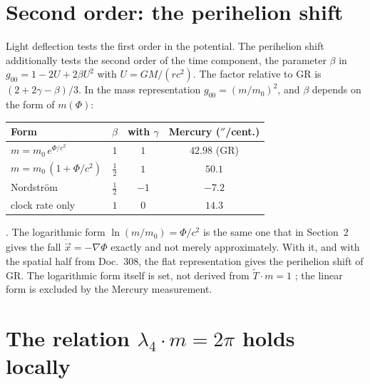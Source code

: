 \section{Second order: the perihelion shift}

Light deflection tests the first order in the potential. The perihelion shift additionally tests
the second order of the time component, the parameter $\beta$ in $g_{00}=1-2U+2\beta U^2$ with
$U=GM/(rc^2)$. The factor relative to GR is $(2+2\gamma-\beta)/3$. In the mass representation
$g_{00}=(m/m_0)^2$, and $\beta$ depends on the form of $m(\Phi)$:
\begin{center}
\begin{tabular}{lccc}
\toprule
Form & $\beta$ & with $\gamma$ & Mercury ($''$/cent.) \\
\midrule
$m=m_0\,e^{\Phi/c^2}$ & $1$ & $1$ & $42.98$ (GR) \\
$m=m_0\,(1+\Phi/c^2)$ & $\tfrac12$ & $1$ & $50.1$ \\
Nordström & $\tfrac12$ & $-1$ & $-7.2$ \\
clock rate only & $1$ & $0$ & $14.3$ \\
\bottomrule
\end{tabular}
\end{center}
\KM. The logarithmic form $\ln(m/m_0)=\Phi/c^2$ is the same one that in Section~2 gives the fall
$\ddot{\vec x}=-\nabla\Phi$ exactly and not merely approximately. With it, and with the spatial
half from Doc.~308, the flat representation gives the perihelion shift of GR. The logarithmic form
itself is set, not derived from $\tilde T\cdot m=1$ \SM; the linear form is excluded by the
Mercury measurement.

\section{The relation \texorpdfstring{$\lambda_4\cdot m=2\pi$}{lambda4 m = 2 pi} holds locally}

